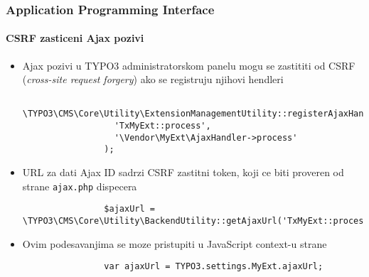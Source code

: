 \begin{frame}[fragile]
	\frametitle{Application Programming Interface}
	\framesubtitle{CSRF zasticeni Ajax pozivi}

	\lstset{
		basicstyle=\tiny\ttfamily
	}

	\begin{itemize}
		\item Ajax pozivi u TYPO3 administratorskom panelu mogu se zastititi od CSRF (\textit{cross-site request forgery}) ako se registruju njihovi hendleri

			\begin{lstlisting}
				\TYPO3\CMS\Core\Utility\ExtensionManagementUtility::registerAjaxHandler(
				  'TxMyExt::process',
				  '\Vendor\MyExt\AjaxHandler->process'
				);
			\end{lstlisting}

		\item URL za dati Ajax ID sadrzi CSRF zastitni token, koji ce biti proveren od strane \texttt{ajax.php} dispecera

			\begin{lstlisting}
				$ajaxUrl = \TYPO3\CMS\Core\Utility\BackendUtility::getAjaxUrl('TxMyExt::process');
			\end{lstlisting}

		\item Ovim podesavanjima se moze pristupiti u JavaScript context-u strane

			\begin{lstlisting}
				var ajaxUrl = TYPO3.settings.MyExt.ajaxUrl;
			\end{lstlisting}

	\end{itemize}

\end{frame}



